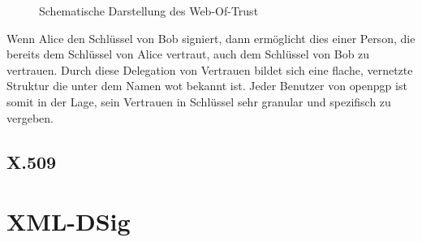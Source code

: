 \begin{figure}
\centering

\caption{Schematische Darstellung des Web-Of-Trust}
\label{fig:wot}
\end{figure}

Wenn Alice den Schlüssel von Bob signiert, dann ermöglicht dies einer Person, die bereits dem Schlüssel von Alice vertraut, auch dem Schlüssel von Bob zu
vertrauen. Durch diese Delegation von Vertrauen bildet sich eine flache, vernetzte Struktur die unter dem Namen \gls{wot} bekannt ist. Jeder Benutzer von
\gls{openpgp} ist somit in der Lage, sein Vertrauen in Schlüssel sehr granular und spezifisch zu vergeben.

\subsection{X.509}
\label{sec:GrundlagenDefinitionen:DigitaleSignaturen:Verfahren:x509}

\section{XML-DSig}
\label{sec:GrundlagenDefinitionen:xml-dsig}
